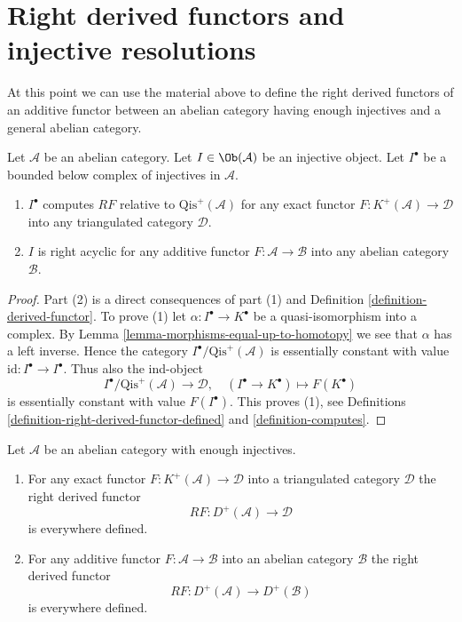 \section{Right derived functors and injective resolutions}
\label{section-right-derived-functor}

\noindent
At this point we can use the material above to define the right derived
functors of an additive functor between an abelian category having
enough injectives and a general abelian category.

\begin{lemma}
\label{lemma-injective-acyclic}
Let $\mathcal{A}$ be an abelian category.
Let $I \in \Ob(\mathcal{A})$ be an injective object.
Let $I^\bullet$ be a bounded below complex of injectives in $\mathcal{A}$.
\begin{enumerate}
\item $I^\bullet$ computes $RF$ relative to $\text{Qis}^{+}(\mathcal{A})$
for any exact functor $F : K^{+}(\mathcal{A}) \to \mathcal{D}$
into any triangulated category $\mathcal{D}$.
\item $I$ is right acyclic for any additive functor
$F : \mathcal{A} \to \mathcal{B}$ into any abelian category $\mathcal{B}$.
\end{enumerate}
\end{lemma}

\begin{proof}
Part (2) is a direct consequences of part (1) and
Definition \ref{definition-derived-functor}.
To prove (1) let $\alpha : I^\bullet \to K^\bullet$ be a quasi-isomorphism
into a complex. By
Lemma \ref{lemma-morphisms-equal-up-to-homotopy}
we see that $\alpha$ has a left inverse. Hence the category
$I^\bullet/\text{Qis}^{+}(\mathcal{A})$ is essentially constant with value
$\text{id} : I^\bullet \to I^\bullet$. Thus also the ind-object
$$
I^\bullet/\text{Qis}^{+}(\mathcal{A}) \longrightarrow \mathcal{D}, \quad
(I^\bullet \to K^\bullet) \longmapsto F(K^\bullet)
$$
is essentially constant with value $F(I^\bullet)$. This proves (1), see
Definitions \ref{definition-right-derived-functor-defined} and
\ref{definition-computes}.
\end{proof}

\begin{lemma}
\label{lemma-enough-injectives-right-derived}
Let $\mathcal{A}$ be an abelian category with enough injectives.
\begin{enumerate}
\item For any exact functor $F : K^{+}(\mathcal{A}) \to \mathcal{D}$
into a triangulated category $\mathcal{D}$ the right derived
functor
$$
RF : D^{+}(\mathcal{A}) \longrightarrow \mathcal{D}
$$
is everywhere defined.
\item For any additive functor $F : \mathcal{A} \to \mathcal{B}$ into an
abelian category $\mathcal{B}$ the right derived functor
$$
RF : D^{+}(\mathcal{A}) \longrightarrow D^{+}(\mathcal{B})
$$
is everywhere defined.
\end{enumerate}
\end{lemma}

